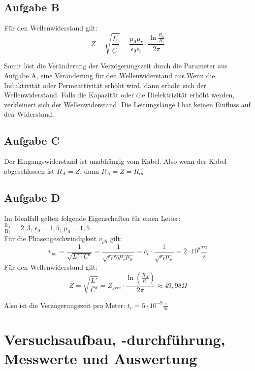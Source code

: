 \documentclass{article}
\begin{document}
\subsection*{Aufgabe B}
Für den Wellenwiderstand gilt: 
\begin{equation}
    Z = \sqrt{\frac{L^{\prime}}{C^{\prime}}} = \frac{\mu_0 \mu_r}{\epsilon_0\epsilon_r}\cdot \frac{\ln{\frac{R_a}{R_i}}}{2\pi}
\end{equation}

Somit löst die Veränderung der Verzögerungszeit durch die Parameter aus Aufgabe A, eine Veränderung für den Wellenwiderstand aus.Wenn die Induktivität oder Permeattivität erhöht wird, dann erhöht sich der Wellenwiderstand. Falls die Kapazität oder die Dielektrizität erhöht werden, verkleinert sich der Wellenwiderstand. Die Leitungslänge l hat keinen Einfluss auf den Widerstand.



\subsection*{Aufgabe C}
Der Eingangswiderstand ist unabhängig vom Kabel. Also wenn der Kabel abgeschlossen ist $R_A = Z$, dann $R_A = Z= R_{in}$


\subsection*{Aufgabe D}


Im Idealfall gelten folgende Eigenschaften für einen Leiter:
\\ $\frac{\mathrm{R_A}}{\mathrm{R_1}} = 2,3$, $\epsilon_0 = 1,5$, $\mu_0 = 1,5$. 
\\
Für die Phasengeschwindigkeit $v_{ph}$ gilt: 
\begin{equation*}
    v_{ph} = \frac{1}{\sqrt{L'\cdot C'}} = \frac{1}{\sqrt{\epsilon_r \epsilon_0 \mu_r \mu_0}} = c_o \cdot \frac{1}{\sqrt{\epsilon_r \mu_r}} = 2 \cdot 10^8  \frac{m}{s} 
\end{equation*}
Für den Wellenwiderstand gilt:
\begin{equation}
    Z = \sqrt{{\frac{L'}{C'}}} = Z_{frei} \cdot \frac{\ln(\frac{R_A}{R_1})}{2\pi} \approx 49,98\Omega
\end{equation}

Also ist die Verzögerungszeit pro Meter: $t_v = 5 \cdot 10^{-9} \frac{s}{m}$

\section{Versuchsaufbau, -durchführung, Messwerte und Auswertung}
		
\end{document}
